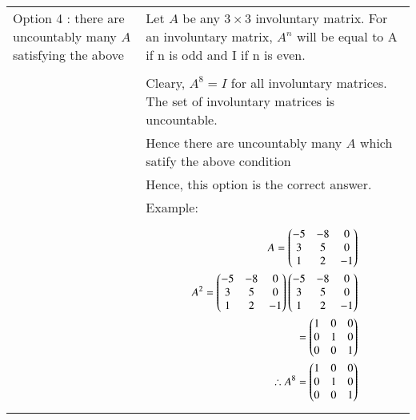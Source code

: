\documentclass[journal,12pt,twocolumn]{IEEEtran}
\begin{document}
\begin{table}[h!]
\begin{center}
\begin{tabular}{ | m{3cm} | m{5cm}| } \hline 
Option 4 :  there are uncountably many  $A$ satisfying the above & Let $A$ be any $3 \times 3$  involuntary matrix.  For an involuntary matrix, $A^n$ will be equal to A if n is odd and I if n is even.\\&\\&
Cleary, $A^8 = I$ for all involuntary matrices. The set of involuntary matrices is uncountable.\\&  Hence there are uncountably many $A$ which satify the above condition\\&
Hence, this option is the correct answer.\\&
Example:\\&
{\begin{align*}
A = \begin{pmatrix}-5&-8&0\\3&5&0\\1&2&-1\end{pmatrix}\\
A^2= \begin{pmatrix}-5&-8&0\\3&5&0\\1&2&-1\end{pmatrix}\begin{pmatrix}-5&-8&0\\3&5&0\\1&2&-1\end{pmatrix}\\
= \begin{pmatrix}1&0&0\\0&1&0\\0&0&1\end{pmatrix}\\
\therefore A^8 = \begin{pmatrix}1&0&0\\0&1&0\\0&0&1\end{pmatrix}\\
\end{align*}}
\\  \hline

\end{tabular}
\end{center}
\end{table}
\end{document}
